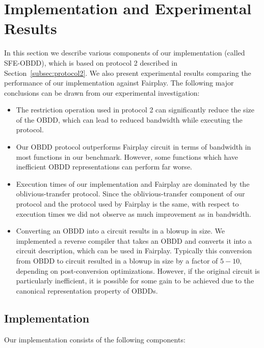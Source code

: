 \section{Implementation and Experimental Results}
\label{sec:experiments}

In this section we describe various components of our
implementation (called SFE-OBDD), which is based on protocol 2 described
in Section~\ref{subsec:protocol2}. We also present experimental results comparing the
performance of our implementation against Fairplay. 
The following major conclusions can be drawn from our experimental
investigation:
\begin{itemize}
\item The restriction operation used in protocol 2 can significantly
reduce the size of the OBDD, which can lead to reduced bandwidth while
executing the protocol. 

\item Our OBDD protocol outperforms Fairplay circuit in terms of
bandwidth in most functions in our benchmark.  However, some functions which
have inefficient OBDD representations can perform far worse.

\item Execution times of our implementation and Fairplay are dominated
by the oblivious-transfer protocol. Since the oblivious-transfer
component of our protocol and the protocol used by Fairplay is the
same, with respect to execution times we did not observe as much
improvement as in bandwidth.  

\item Converting an OBDD into a circuit  results in a 
blowup in size. We implemented a reverse compiler that takes an OBDD and
converts it into a circuit description, which can be used in Fairplay.
Typically this conversion from OBDD to circuit resulted in a
blowup in size by a factor of $5-10$, depending on post-conversion
optimizations.  However, if the original circuit is particularly inefficient, 
it is possible for some gain to be achieved due to the canonical 
representation property of OBDDs.

\end{itemize}

\subsection{Implementation}
Our implementation consists of the following components:

